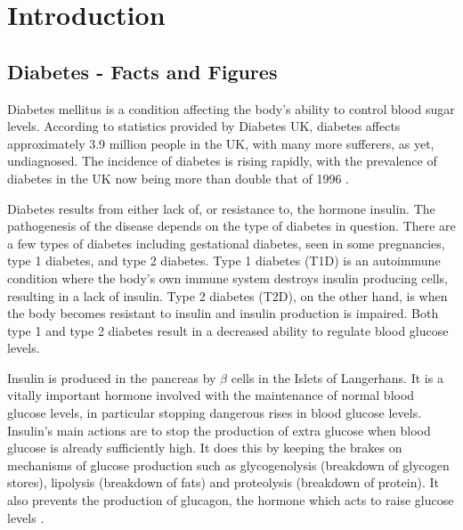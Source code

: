 
\chapter{Introduction}


\section{Diabetes - Facts and Figures}
\label{sec:sectionLabel}


Diabetes mellitus is a condition affecting the body's ability to control blood sugar levels.
According to statistics provided by Diabetes UK, diabetes affects approximately 3.9 million people in the UK, with many more sufferers, as yet, undiagnosed.
The incidence of diabetes is rising rapidly, with the prevalence of diabetes in the UK now being more than double that of 1996 \citep{DiabetesUK}.


Diabetes results from either lack of, or resistance to, the hormone insulin.
The pathogenesis of the disease depends on the type of diabetes in question.
There are a few types of diabetes including gestational diabetes, seen in some pregnancies, type 1 diabetes, and type 2 diabetes.
Type 1 diabetes (T1D) is an autoimmune condition where the body's own immune system destroys insulin producing cells, resulting in a lack of insulin.
Type 2 diabetes (T2D), on the other hand, is when the body becomes resistant to insulin and insulin production is impaired.
Both type 1 and type 2 diabetes result in a decreased ability to regulate blood glucose levels.

Insulin is produced in the pancreas by $\beta$ cells in the Islets of Langerhans.
It is a vitally important hormone involved with the maintenance of normal blood glucose levels, in particular stopping dangerous rises in blood glucose levels.
Insulin's main actions are to stop the production of extra glucose when blood glucose is already sufficiently high.
It does this by keeping the brakes on mechanisms of glucose production such as glycogenolysis (breakdown of glycogen stores), lipolysis (breakdown of fats) and proteolysis (breakdown of protein).
It also prevents the production of glucagon, the hormone which acts to raise glucose levels \citep{Sonksen2000}.


